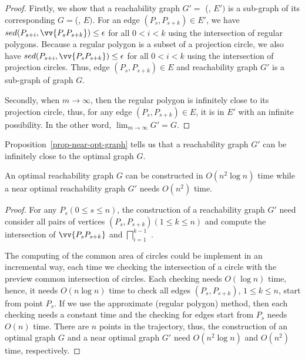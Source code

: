 \begin{proof}
	Firstly, we show that a reachability graph $G'=$ (, $E')$ is a sub-graph of its corresponding $G=$(, $E)$.
	For an edge $(P_s, P_{s+k}) \in E'$, we have $sed(P_{s+i}, \vv{P_sP_{s+k}}) \le \epsilon$ for all $0<i<k$ using the intersection of regular polygons. 
	Because a regular polygon is a subset of a projection circle, we also have $sed(P_{s+i}, \vv{P_sP_{s+k}}) \le \epsilon$ for all $0<i<k$ using the intersection of projection circles.
	Thus, edge $(P_s, P_{s+k}) \in E$ and reachability graph $G'$ is a sub-graph of graph $G$.
	
	Secondly, when $m \to \infty$, then the regular polygon is infinitely close to its projection circle, thus, for any edge $(P_s, P_{s+k}) \in E$, it is in $E'$ with an infinite possibility. In the other word, $\lim_{m \to \infty}{G'=G}$.
\end{proof}

Proposition~\ref{prop-near-opt-graph} tells us that a reachability graph $G'$ can be infinitely close to the optimal graph $G$.

\begin{prop}
	\label{prop-near-opt-graph-construction}
	An optimal reachability graph $G$ can be constructed in $O(n^2\log n)$ time while
	a near optimal reachability graph $G'$ needs $O(n^2)$ time.
\end{prop}

	
\begin{proof}
For any $P_s (0\le s \le n)$, the construction of a reachability graph $G'$ need consider all pairs of vertices $(P_s,P_{s+k}) (1\le k \le n)$ and compute the intersection of $\vv{P_sP_{s+k}}$ and $\bigsqcap_{i=1}^{k - 1}$ .

The computing of the common area of circles could be implement in an incremental way, \ie each time we checking the intersection of a circle with the preview common intersection of circles. Each checking needs $O(\log n)$ time, hence, it needs $O(n\log n)$ time to check all edges $(P_s,P_{s+k})$, $1\le k \le n$, start from point $P_s$. 
If we use the approximate (regular polygon) method, then each checking needs a constant time and the checking for edges start from $P_s$ needs $O(n)$ time.
%
There are $n$ points in the trajectory, thus, the construction of an optimal graph $G$ and a near optimal graph $G'$ need $O(n^2 \log n)$ and $O(n^2)$ time, respectively.
\end{proof}

